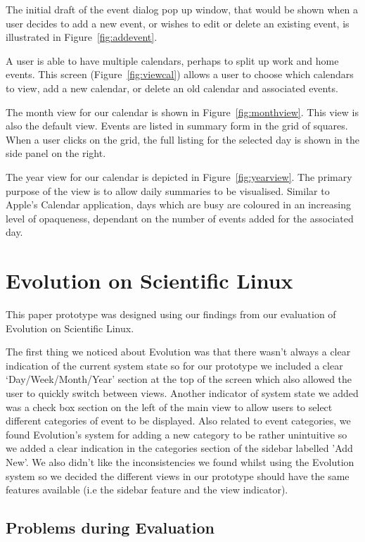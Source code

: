 \documentclass{article}
\begin{document}
The initial draft of the event dialog pop up window, that would be
shown when a user decides to add a new event, or wishes to edit or
delete an existing event, is illustrated in Figure~\ref{fig:addevent}.

A user is able to have multiple calendars, perhaps to split up work and
home events. This screen (Figure~\ref{fig:viewcal}) allows a user to
choose which calendars to view, add a new calendar, or delete an old
calendar and associated events.

The month view for our calendar is shown in Figure~\ref{fig:monthview}.
This view is also the default view. Events are listed in summary form
in the grid of squares. When a user clicks on the grid, the full listing
for the selected day is shown in the side panel on the right.

The year view for our calendar is depicted in Figure~\ref{fig:yearview}.
The primary purpose of the view is to allow daily summaries to be
visualised. Similar to Apple's Calendar application, days which are
busy are coloured in an increasing level of opaqueness, dependant on
the number of events added for the associated day.

\section{Evolution on Scientific Linux}

This paper prototype was designed using our findings from our evaluation 
of Evolution on Scientific Linux.

The first thing we noticed about Evolution was that there wasn't always
a clear indication of the current system state so for our prototype we
included a clear `Day/Week/Month/Year' section at the top of the screen
which also allowed the user to quickly switch between views. Another
indicator of system state we added was a check box section on the left of
the main view to allow users to select different categories of event to
be displayed. Also related to event categories, we found Evolution's
system for adding a new category to be rather unintuitive so we added a
clear indication in the categories section of the sidebar labelled
'Add New'. We also didn't like the inconsistencies we found whilst
using the Evolution system so we decided the different views in our
prototype should have the same features available (i.e the sidebar
feature and the view indicator).


\subsection{Problems during Evaluation}
\end{document}
